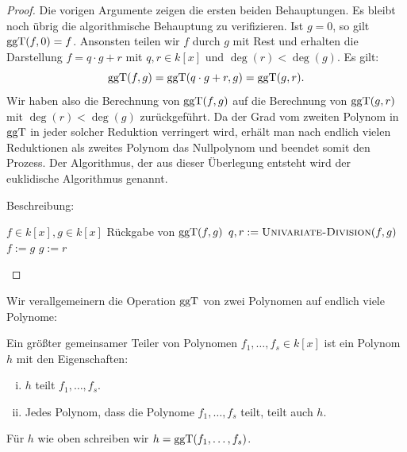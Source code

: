 \documentclass[11pt]{article}
\numberwithin{equation}{section}
\begin{document}
\begin{proof}
	Die vorigen Argumente zeigen die ersten beiden Behauptungen. Es bleibt noch übrig die algorithmische Behauptung zu verifizieren. Ist $g=0$, so gilt $\operatorname{ggT}(f,0) = f$. Ansonsten teilen wir $f$ durch $g$ mit Rest und erhalten die Darstellung $f = q \cdot g + r$ mit $q,r \in k[x]$ und $\deg(r) < \deg(g)$.  Es gilt:
	\[
		\operatorname{ggT}(f,g) = \operatorname{ggT}(q \cdot g + r, g) = \operatorname{ggT}(g,r).  
	\]
	Wir haben also die Berechnung von $\operatorname{ggT}(f,g)$ auf die Berechnung von $\operatorname{ggT}(g,r)$ mit $\deg(r) < \deg(g)$ zurückgeführt. Da der Grad vom zweiten Polynom in $\operatorname{ggT}$ in jeder solcher Reduktion verringert wird, erhält man nach endlich vielen Reduktionen als zweites Polynom das Nullpolynom und beendet somit den Prozess. Der Algorithmus, der aus dieser Überlegung entsteht wird der euklidische Algorithmus genannt. 
	
	Beschreibung: 
	
\begin{algorithm}[H]
	\caption{$\cc{Greatest-Common-Divisor}(f,g)$}
	\begin{algorithmic}[1]
		\REQUIRE $f \in k[x], g \in k[x]$
		\ENSURE Rückgabe von $\operatorname{ggT}(f,g)$
		\STATE{}
		\STATE $q, r:= \mathop{\text{\textsc{Univariate-Division}}}(f,g)$
		\STATE $f:=g$
		\STATE $g:=r$ 
		\STATE {}
		\ENDWHILE 
	\end{algorithmic}
\end{algorithm}
\end{proof} 


Wir verallgemeinern die Operation $\operatorname{ggT}$ von zwei Polynomen auf endlich viele Polynome: 
\begin{definition}
	Ein größter gemeinsamer Teiler von Polynomen $f_1,\ldots,f_s \in k[x]$ ist ein Polynom $h$ mit den Eigenschaften:
	\begin{enumerate}[(i)]
			\item $h$ teilt $f_1,\ldots,f_s$. 
			\item Jedes Polynom, dass die Polynome $f_1,\ldots,f_s$ teilt, teilt auch $h$.
	\end{enumerate} 
	Für $h$ wie oben schreiben wir $h = \operatorname{ggT}(f_1,\ldots,f_s)$. 
\end{definition} 
\end{document}
